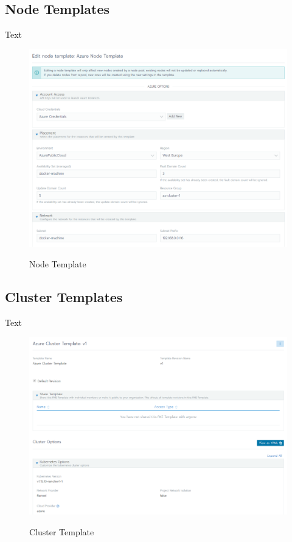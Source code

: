 \subsection{Node Templates}

Text 

\begin{figure}[H]
\centering
\caption {Node Template}
\includegraphics[width=\linewidth]{images/node-template.png}
\label{fig:nodeTemplate}
\end{figure}

\subsection{Cluster Templates}

Text 

\begin{figure}[H]
\centering
\caption {Cluster Template}
\includegraphics[width=\linewidth]{images/cluster-template.png}
\label{fig:clusterTemplate}
\end{figure}

